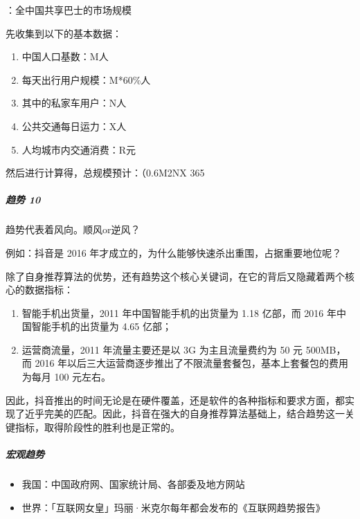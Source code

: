 \documentclass[letterpaper,11pt,english]{sphinxmanual}
\begin{document}
：全中国共享巴士的市场规模

先收集到以下的基本数据：
\begin{enumerate}
%
\item {} 
中国人口基数：M人

\item {} 
每天出行用户规模：M*60\%人

\item {} 
其中的私家车用户：N人

\item {} 
公共交通每日运力：X人

\item {} 
人均城市内交通消费：R元

\end{enumerate}

然后进行计算得，总规模预计：（0.6M\sphinxhyphen{}2N\sphinxhyphen{}X 365


\subparagraph{趋势 10\sphinxfootnotemark[430]}
\label{\detokenize{chapter_knowledge/industry_analysis:id9}}%
\begin{footnotetext}[430]\sphinxAtStartFootnote
{}
%
\end{footnotetext}\ignorespaces 
趋势代表着风向。顺风or逆风？

例如：抖音是 2016 年才成立的，为什么能够快速杀出重围，占据重要地位呢？

除了自身推荐算法的优势，还有趋势这个核心关键词，在它的背后又隐藏着两个核心的数据指标：
\begin{enumerate}
%
\item {} 
智能手机出货量，2011 年中国智能手机的出货量为 1.18 亿部，而 2016
年中国智能手机的出货量为 4.65 亿部；

\item {} 
运营商流量，2011 年流量主要还是以 3G 为主且流量费约为 50 元 500MB，而
2016
年以后三大运营商逐步推出了不限流量套餐包，基本上套餐包的费用为每月
100 元左右。

\end{enumerate}

因此，抖音推出的时间无论是在硬件覆盖，还是软件的各种指标和要求方面，都实现了近乎完美的匹配。因此，抖音在强大的自身推荐算法基础上，结合趋势这一关键指标，取得阶段性的胜利也是正常的。


\subparagraph{宏观趋势}
\label{\detokenize{chapter_knowledge/industry_analysis:id10}}\begin{itemize}
\item {} 
我国：中国政府网、国家统计局、各部委及地方网站

\item {} 
世界：「互联网女皇」玛丽·米克尔每年都会发布的《互联网趋势报告》

\end{itemize}
\end{document}

